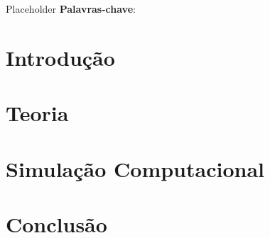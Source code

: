 \documentclass[10pt,twoside,a4paper,brazil]{abntex2}
\begin{document}
   \imprimircapa
   \imprimirfolhaderosto
   \tableofcontents

   \begin{resumo}
      Placeholder
      \vspace{\onelineskip}
      \noindent
      \textbf{Palavras-chave}:
   \end{resumo}

   \chapter{Introdução}
      
      
   \chapter{Teoria}
      
     
   \chapter{Simulação Computacional}
      

   \chapter{Conclusão}
      

   
\end{document}

